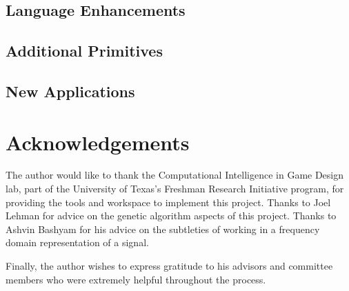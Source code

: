 \documentclass[12pt]{article}
\begin{document}
\subsection{Language Enhancements}\label{FUTUREENHANCEMENTS}
\subsection{Additional Primitives}\label{FUTUREPRIMITIVES}
\subsection{New Applications}\label{FUTUREAPPLICATIONS}

\section{Acknowledgements}
The author would like to thank the Computational Intelligence in Game Design lab, part of the University of Texas's Freshman Research Initiative program, for providing the tools and workspace to implement this project. Thanks to Joel Lehman for advice on the genetic algorithm aspects of this project. Thanks to Ashvin Bashyam for his advice on the subtleties of working in a frequency domain representation of a signal. 
\begin{comment}
Thanks to TESTERS for kindly agreeing to test the interactive genetic algorithm.
\end{comment}
Finally, the author wishes to express gratitude to his advisors and committee members who were extremely helpful throughout the process.






\end{document}
